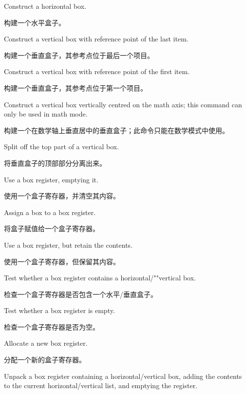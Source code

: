 \begin{inventory}
\item [\cs{hbox}] 
      Construct a horizontal box.

      构建一个水平盒子。
\item [\cs{vbox}] 
      Construct a vertical box with reference point of the last item.

      构建一个垂直盒子，其参考点位于最后一个项目。
\item [\cs{vtop}] 
      Construct a vertical box with reference point of the first item.

      构建一个垂直盒子，其参考点位于第一个项目。
\item [\cs{vcenter}] 
      Construct a vertical box vertically centred
      on the math axis; this command can only be used in math mode.

      构建一个在数学轴上垂直居中的垂直盒子；此命令只能在数学模式中使用。
\item [\cs{vsplit}] 
      Split off the top part of a vertical box. 

      将垂直盒子的顶部部分分离出来。
\item [\cs{box}] 
      Use a box register, emptying it. 

      使用一个盒子寄存器，并清空其内容。
\item [\cs{setbox}] 
      Assign a box to a box register.

      将盒子赋值给一个盒子寄存器。
\item [\cs{copy}] 
      Use a box register, but retain the contents. 

      使用一个盒子寄存器，但保留其内容。
\item [\cs{ifhbox \cs{ifvbox}}]
\mdqon
      Test whether a box register contains a horizontal/""vertical box.

      检查一个盒子寄存器是否包含一个水平/垂直盒子。
\mdqoff

\item [\cs{ifvoid}] 
      Test whether a box register is empty.

      检查一个盒子寄存器是否为空。
\item [\cs{newbox}] 
      Allocate a new box register. 

      分配一个新的盒子寄存器。
\item [\cs{unhbox \cs{unvbox}}]
      Unpack a box register containing a horizontal/vertical box,
      adding the contents to the current horizontal/vertical list,
      and emptying the register. 


\end{inventory}

